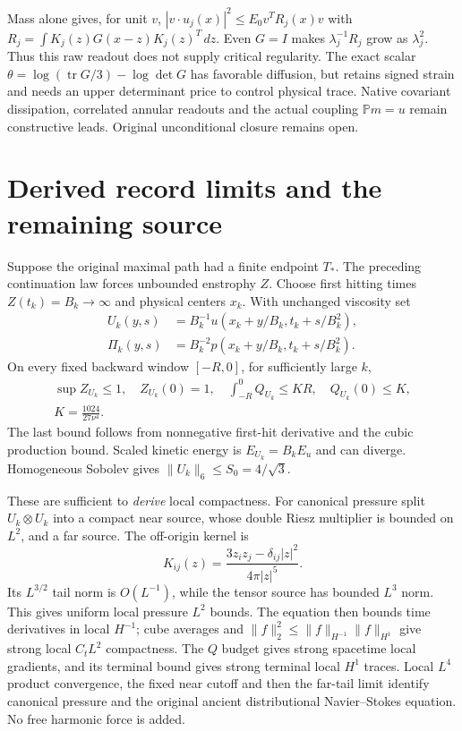 \documentclass[11pt]{article}
\begin{document}
Mass alone gives, for unit $v$,
$|v\cdot u_j(x)|^2\le E_0v^TR_j(x)v$ with
$R_j=\int K_j(z)G(x-z)K_j(z)^T\,dz$.
Even $G=I$ makes $\lambda_j^{-1}R_j$ grow as $\lambda_j^2$.
Thus this raw readout does not supply critical regularity. The exact
scalar $\theta=\log(\operatorname{tr}G/3)-\log\det G$ has favorable
diffusion, but retains signed strain and needs an upper determinant price
to control physical trace. Native covariant dissipation, correlated
annular readouts and the actual coupling $\mathbb Pm=u$ remain constructive
leads. Original unconditional closure remains open.


\section{Derived record limits and the remaining source}

Suppose the original maximal path had a finite endpoint $T_*$.
The preceding continuation law forces unbounded enstrophy $Z$.
Choose first hitting times $Z(t_k)=B_k\to\infty$ and physical centers $x_k$.
With unchanged viscosity set
\[
 \begin{aligned}
 U_k(y,s)&=B_k^{-1}u(x_k+y/B_k,t_k+s/B_k^2),\\
 \Pi_k(y,s)&=B_k^{-2}p(x_k+y/B_k,t_k+s/B_k^2).
 \end{aligned}
\]
On every fixed backward window $[-R,0]$, for sufficiently large $k$,
\[
 \begin{gathered}
 \sup Z_{U_k}\le1,\quad Z_{U_k}(0)=1,\quad
 \int_{-R}^0 Q_{U_k}\le KR,\quad Q_{U_k}(0)\le K,\\
 K=\frac{1024}{27\nu^4}.
 \end{gathered}
\]
The last bound follows from nonnegative first-hit derivative and the cubic
production bound. Scaled kinetic energy is $E_{U_k}=B_kE_u$ and can diverge.
Homogeneous Sobolev gives $\|U_k\|_6\le S_0=4/\sqrt3$.

These are sufficient to \emph{derive} local compactness. For canonical
pressure split $U_k\otimes U_k$ into a compact near source, whose double
Riesz multiplier is bounded on $L^2$, and a far source. The off-origin
kernel is
\[
 K_{ij}(z)=\frac{3z_iz_j-\delta_{ij}|z|^2}{4\pi|z|^5}.
\]
Its $L^{3/2}$ tail norm is $O(L^{-1})$, while the tensor source has bounded
$L^3$ norm. This gives uniform local pressure $L^2$ bounds. The equation
then bounds time derivatives in local $H^{-1}$; cube averages and
$\|f\|_2^2\le\|f\|_{H^{-1}}\|f\|_{H^1}$ give strong local
$C_tL^2$ compactness. The $Q$ budget gives strong spacetime local gradients,
and its terminal bound gives strong terminal local $H^1$ traces.
Local $L^4$ product convergence, the fixed near cutoff and then the far-tail
limit identify canonical pressure and the original ancient distributional
Navier--Stokes equation. No free harmonic force is added.
\end{document}
